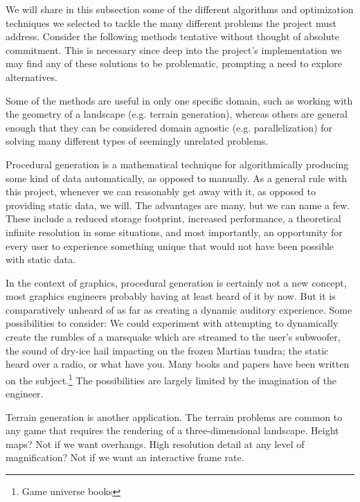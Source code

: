
We will share in this subsection some of the different algorithms and optimization techniques we selected to tackle the many different problems the project must address. Consider the following methods tentative without thought of absolute commitment. This is necessary since deep into the project's implementation we may find any of these solutions to be problematic, prompting a need to explore alternatives. 

Some of the methods are useful in only one specific domain, such as working with the geometry of a landscape (e.g. terrain generation), whereas others are general enough that they can be considered domain agnostic (e.g. parallelization) for solving many different types of seemingly unrelated problems.

Procedural generation is a mathematical technique for algorithmically producing some kind of data automatically, as opposed to manually. As a general rule with this project, whenever we can reasonably get away with it, as opposed to providing static data, we will. The advantages are many, but we can name a few. These include a reduced storage footprint, increased performance, a theoretical infinite resolution in some situations, and most importantly, an opportunity for every user to experience something unique that would not have been possible with static data.

In the context of graphics, procedural generation is certainly not a new concept, most graphics engineers probably having at least heard of it by now. But it is comparatively unheard of as far as creating a dynamic auditory experience. Some possibilities to consider: We could experiment with attempting to dynamically create the rumbles of a marsquake which are streamed to the user's subwoofer, the sound of dry-ice hail impacting on the frozen Martian tundra; the static heard over a radio, or what have you. Many books and papers have been written on the subject.\footnote{Game universe books} The possibilities are largely limited by the imagination of the engineer.

Terrain generation is another application. The terrain problems are common to any game that requires the rendering of a three-dimensional landscape. Height maps? Not if we want overhangs. High resolution detail at any level of magnification? Not if we want an interactive frame rate.

